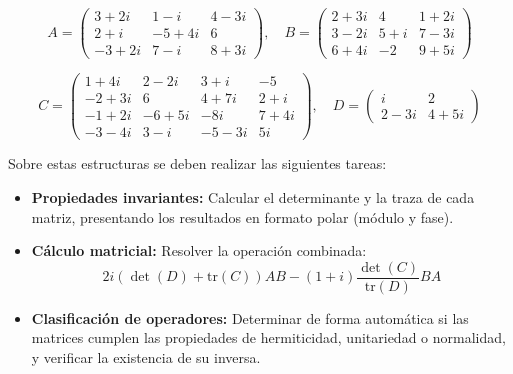 \documentclass[11pt,a4paper,spanish]{book}
\begin{document}
$$A = \begin{pmatrix} 3+2i & 1-i & 4-3i \\ 2+i & -5+4i & 6 \\ -3+2i & 7-i & 8+3i \end{pmatrix}, \quad B = \begin{pmatrix} 2+3i & 4 & 1+2i \\ 3-2i & 5+i & 7-3i \\ 6+4i & -2 & 9+5i \end{pmatrix}$$

$$C = \begin{pmatrix} 1+4i & 2-2i & 3+i & -5 \\ -2+3i & 6 & 4+7i & 2+i \\ -1+2i & -6+5i & -8i & 7+4i \\ -3-4i & 3-i & -5-3i & 5i \end{pmatrix}, \quad D = \begin{pmatrix} i & 2 \\ 2-3i & 4+5i \end{pmatrix}$$

Sobre estas estructuras se deben realizar las siguientes tareas:
\begin{itemize}
    \item \textbf{Propiedades invariantes:} Calcular el determinante y la traza de cada matriz, presentando los resultados en formato polar (módulo y fase).
    \item \textbf{Cálculo matricial:} Resolver la operación combinada:
    $$2i(\det(D) + \text{tr}(C))AB - (1+i)\frac{\det(C)}{\text{tr}(D)}BA$$
    \item \textbf{Clasificación de operadores:} Determinar de forma automática si las matrices cumplen las propiedades de hermiticidad, unitariedad o normalidad, y verificar la existencia de su inversa.
\end{itemize}
\end{document}
